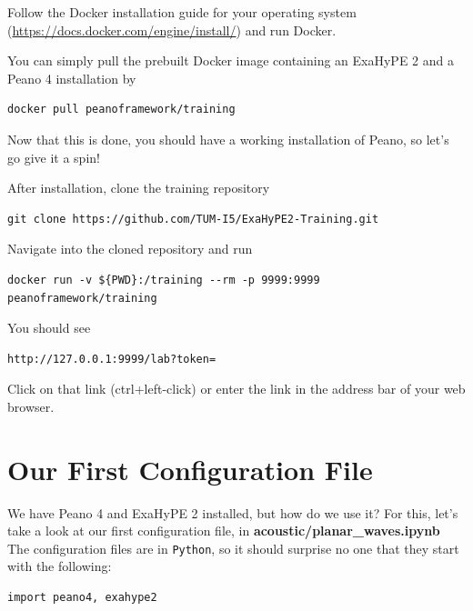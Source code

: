 \documentclass[12pt,letterpaper]{article}
\begin{document}
Follow the Docker installation guide for your operating system (\url{https://docs.docker.com/engine/install/}) and run Docker.

You can simply pull the prebuilt Docker image containing an ExaHyPE 2 and a Peano 4 installation by

\begin{lstlisting}[style = Bash]
docker pull peanoframework/training
\end{lstlisting}

Now that this is done, you should have a working installation of Peano, so let's go give it a spin!

After installation, clone the training repository

\begin{lstlisting}[style = Bash]
git clone https://github.com/TUM-I5/ExaHyPE2-Training.git
\end{lstlisting}

Navigate into the cloned repository and run

\begin{lstlisting}[style = Bash]
docker run -v ${PWD}:/training --rm -p 9999:9999 peanoframework/training
\end{lstlisting}

You should see

\begin{lstlisting}[style = Bash]
http://127.0.0.1:9999/lab?token=
\end{lstlisting}

Click on that link (ctrl+left-click) or enter the link in the address bar of your web browser.

\newpage

\section{Our First Configuration File}
\label{section_3}

We have Peano 4 and ExaHyPE 2 installed, but how do we use it? For this, let's take a look at our first configuration file, in \textbf{acoustic/planar\_waves.ipynb}\\
The configuration files are in \texttt{Python}, so it should surprise no one that they start with the following:\\

\begin{lstlisting}[style = Python]
import peano4, exahype2
\end{lstlisting}
\end{document}
